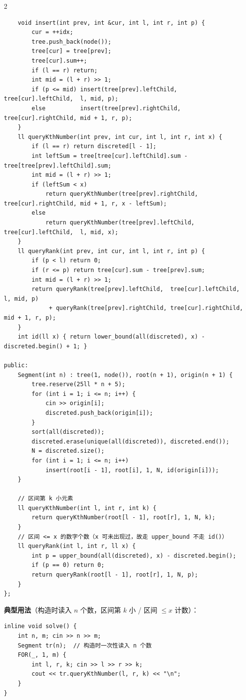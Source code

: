 \begin{multicols*}{2}
\begin{verbatim}
    void insert(int prev, int &cur, int l, int r, int p) {
        cur = ++idx;
        tree.push_back(node());
        tree[cur] = tree[prev];
        tree[cur].sum++;
        if (l == r) return;
        int mid = (l + r) >> 1;
        if (p <= mid) insert(tree[prev].leftChild,  tree[cur].leftChild,  l, mid, p);
        else          insert(tree[prev].rightChild, tree[cur].rightChild, mid + 1, r, p);
    }
    ll queryKthNumber(int prev, int cur, int l, int r, int x) {
        if (l == r) return discreted[l - 1];
        int leftSum = tree[tree[cur].leftChild].sum - tree[tree[prev].leftChild].sum;
        int mid = (l + r) >> 1;
        if (leftSum < x)
            return queryKthNumber(tree[prev].rightChild, tree[cur].rightChild, mid + 1, r, x - leftSum);
        else
            return queryKthNumber(tree[prev].leftChild,  tree[cur].leftChild,  l, mid, x);
    }
    ll queryRank(int prev, int cur, int l, int r, int p) {
        if (p < l) return 0;
        if (r <= p) return tree[cur].sum - tree[prev].sum;
        int mid = (l + r) >> 1;
        return queryRank(tree[prev].leftChild,  tree[cur].leftChild,  l, mid, p)
             + queryRank(tree[prev].rightChild, tree[cur].rightChild, mid + 1, r, p);
    }
    int id(ll x) { return lower_bound(all(discreted), x) - discreted.begin() + 1; }

public:
    Segment(int n) : tree(1, node()), root(n + 1), origin(n + 1) {
        tree.reserve(25ll * n + 5);
        for (int i = 1; i <= n; i++) {
            cin >> origin[i];
            discreted.push_back(origin[i]);
        }
        sort(all(discreted));
        discreted.erase(unique(all(discreted)), discreted.end());
        N = discreted.size();
        for (int i = 1; i <= n; i++)
            insert(root[i - 1], root[i], 1, N, id(origin[i]));
    }

    // 区间第 k 小元素
    ll queryKthNumber(int l, int r, int k) {
        return queryKthNumber(root[l - 1], root[r], 1, N, k);
    }
    // 区间 <= x 的数字个数（x 可未出现过，故走 upper_bound 不走 id()）
    ll queryRank(int l, int r, ll x) {
        int p = upper_bound(all(discreted), x) - discreted.begin();
        if (p == 0) return 0;
        return queryRank(root[l - 1], root[r], 1, N, p);
    }
};
		\end{verbatim}

		\textbf{典型用法}（构造时读入 $n$ 个数，区间第 $k$ 小 / 区间 $\le x$ 计数）：

		\begin{verbatim}
inline void solve() {
    int n, m; cin >> n >> m;
    Segment tr(n);  // 构造时一次性读入 n 个数
    FOR(_, 1, m) {
        int l, r, k; cin >> l >> r >> k;
        cout << tr.queryKthNumber(l, r, k) << "\n";
    }
}
		\end{verbatim}


\end{multicols*}
